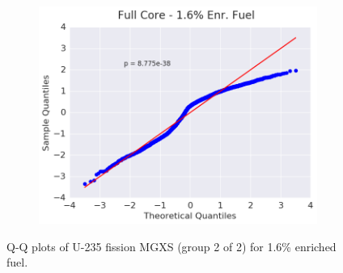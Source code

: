 \begin{figure}[h!]
\begin{subfigure}{0.5\textwidth}
  \includegraphics[width=\linewidth]{figures/patterns/full-core/quantile/16-enr-fiss-2} \caption{}
  \label{fig:chap9-qq-full-core-1.6-fiss}
\end{subfigure}
\caption[Q-Q plots of U-235 fission MGXS for 1.6\% enriched fuel]{\ac{Q-Q} plots of U-235 fission \ac{MGXS} (group 2 of 2) for 1.6\% enriched fuel.}
\label{fig:chap9-qq-1.6-fiss}
\end{figure}

